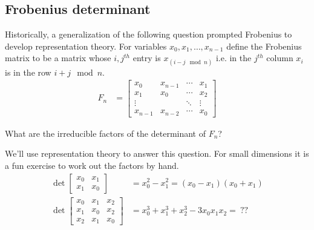 \subsection{Frobenius determinant}
Historically, a generalization of the following question prompted Frobenius to develop representation theory.
For variables $x_0, x_1, \ldots, x_{n-1}$ define the Frobenius matrix to be a matrix whose $i,j^{th}$ entry is $x_{(i-j \mod n)}$ i.e. in the $j^{th}$ column $x_i$ is in the row $i+j \mod n$.
\begin{align}
	F_n & = \begin{bmatrix} x_0 & x_{n-1} & \cdots & x_{1} \\ x_{1} & x_0 & \cdots & x_{2} \\ \vdots&& \ddots &\vdots \\ x_{n-1} & x_{n-2} & \cdots & x_0 \end{bmatrix}
\end{align}
\begin{ques}
	What are the irreducible factors of the determinant of $F_n$?
\end{ques}
We'll use representation theory to answer this question. For small dimensions it is a fun exercise to work out the factors by hand.
\begin{align}
	\det \begin{bmatrix} x_0 & x_1 \\ x_1 & x_0 \end{bmatrix} &= x_0^2 - x_1^2 = (x_0 - x_1)(x_0 + x_1) \\
	\det \begin{bmatrix} x_0 & x_1 & x_2 \\ x_1 & x_0 & x_2 \\ x_2 & x_1 & x_0 \end{bmatrix} &= x_0^3 + x_1^3 + x_2^3 - 3 x_0 x_1 x_2
	= \: ??
\end{align}



